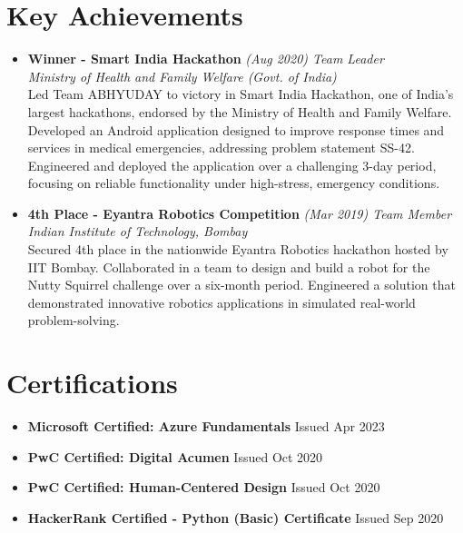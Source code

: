 \documentclass[a4paper,12pt]{article}
\begin{document}
\section{Key Achievements}
\begin{itemize}[noitemsep,topsep=0pt,leftmargin=*]
    \item \textbf{Winner - Smart India Hackathon} \textit{(Aug 2020) Team Leader} \\
    \textit{Ministry of Health and Family Welfare (Govt. of India)} \\
    Led Team ABHYUDAY to victory in Smart India Hackathon, one of India's largest hackathons, endorsed by the Ministry of Health and Family Welfare. Developed an Android application designed to improve response times and services in medical emergencies, addressing problem statement SS-42. Engineered and deployed the application over a challenging 3-day period, focusing on reliable functionality under high-stress, emergency conditions.
    \item \textbf{4th Place - Eyantra Robotics Competition} \textit{(Mar 2019) Team Member} \\
    \textit{Indian Institute of Technology, Bombay} \\
    Secured 4th place in the nationwide Eyantra Robotics hackathon hosted by IIT Bombay. Collaborated in a team to design and build a robot for the Nutty Squirrel challenge over a six-month period. Engineered a solution that demonstrated innovative robotics applications in simulated real-world problem-solving.
\end{itemize}

\section{Certifications}
\begin{itemize}[noitemsep,topsep=0pt,parsep=0pt,itemsep=-3pt,leftmargin=*]
    \item \textbf{Microsoft Certified: Azure Fundamentals} \hfill Issued Apr 2023 \\
    \item \textbf{PwC Certified: Digital Acumen} \hfill Issued Oct 2020 \\
    \item \textbf{PwC Certified: Human-Centered Design} \hfill Issued Oct 2020 \\
    \item \textbf{HackerRank Certified - Python (Basic) Certificate} \hfill Issued Sep 2020 \\
\end{itemize}

\vfill
{}
\end{document}
